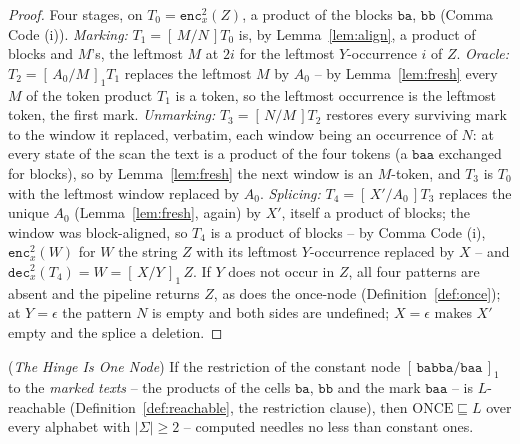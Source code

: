 \documentclass[runningheads,envcountsect]{llncs}
\begin{document}
\begin{proof}
    Four stages, on $T_0 = \mathtt{enc}^2_{x}(Z)$, a product of the blocks $\mathtt{ba}$, $\mathtt{bb}$ (Comma Code (i)). \emph{Marking:} $T_1 = [\,M/N\,]T_0$ is, by Lemma~\ref{lem:align}, a product of blocks and $M$'s, the leftmost $M$ at $2i$ for the leftmost $Y$-occurrence $i$ of $Z$. \emph{Oracle:} $T_2 = [\,A_0/M\,]_1 T_1$ replaces the leftmost $M$ by $A_0$ -- by Lemma~\ref{lem:fresh} every $M$ of the token product $T_1$ is a token, so the leftmost occurrence is the leftmost token, the first mark. \emph{Unmarking:} $T_3 = [\,N/M\,]T_2$ restores every surviving mark to the window it replaced, verbatim, each window being an occurrence of $N$: at every state of the scan the text is a product of the four tokens (a $\mathtt{baa}$ exchanged for blocks), so by Lemma~\ref{lem:fresh} the next window is an $M$-token, and $T_3$ is $T_0$ with the leftmost window replaced by $A_0$. \emph{Splicing:} $T_4 = [\,X'/A_0\,]T_3$ replaces the unique $A_0$ (Lemma~\ref{lem:fresh}, again) by $X'$, itself a product of blocks; the window was block-aligned, so $T_4$ is a product of blocks -- by Comma Code (i), $\mathtt{enc}^2_{x}(W)$ for $W$ the string $Z$ with its leftmost $Y$-occurrence replaced by $X$ -- and $\mathtt{dec}^2_{x}(T_4) = W = [\,X/Y\,]_1\,Z$. If $Y$ does not occur in $Z$, all four patterns are absent and the pipeline returns $Z$, as does the once-node (Definition~\ref{def:once}); at $Y = \epsilon$ the pattern $N$ is empty and both sides are undefined; $X = \epsilon$ makes $X'$ empty and the splice a deletion.
\end{proof}

\begin{corollary}
    (\emph{The Hinge Is One Node})
    \label{cor:once-crux}
    If the restriction of the constant node $[\,\mathtt{babba}/\mathtt{baa}\,]_1$ to the \emph{marked texts} -- the products of the cells $\mathtt{ba}$, $\mathtt{bb}$ and the mark $\mathtt{baa}$ -- is $L$-reachable (Definition~\ref{def:reachable}, the restriction clause), then $\mathrm{ONCE} \sqsubseteq L$ over every alphabet with $|\Sigma| \geq 2$ -- computed needles no less than constant ones.
\end{corollary}
\end{document}
